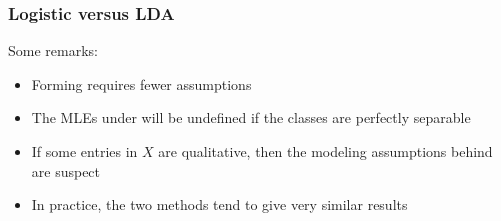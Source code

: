 \documentclass[12pt]{beamer}
\begin{document}
\begin{frame}
\frametitle{Logistic versus LDA}
Some remarks:
\begin{itemize}
\item Forming  requires fewer assumptions
\item The MLEs under  will be undefined if the classes are perfectly separable
\item If some entries in $X$ are qualitative, then the modeling assumptions behind  are suspect
\item In practice, the two methods tend to give very similar results
\end{itemize}
\end{frame}
\end{document}
